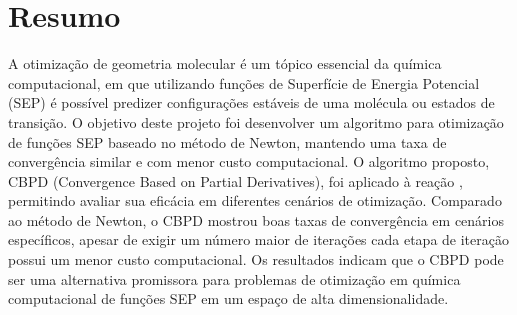 \section{Resumo}

A otimização de geometria molecular é um tópico essencial da química
computacional, em que utilizando funções de Superfície de Energia Potencial (SEP) é possível 
predizer configurações estáveis de uma molécula ou estados de transição. 
O objetivo deste projeto foi desenvolver um algoritmo para otimização de funções SEP baseado no método
de Newton, mantendo uma taxa de convergência similar e com menor custo computacional. 
O algoritmo proposto, CBPD (Convergence Based on Partial Derivatives), foi aplicado à reação 
, permitindo avaliar sua eficácia em diferentes cenários de otimização. 
Comparado ao método de Newton, o CBPD mostrou boas taxas de convergência em cenários específicos,
apesar de exigir um número maior de iterações cada etapa de iteração possui um menor custo computacional.
Os resultados indicam que o CBPD pode ser uma alternativa promissora para problemas de otimização em 
química computacional de funções SEP em um espaço de alta dimensionalidade.
